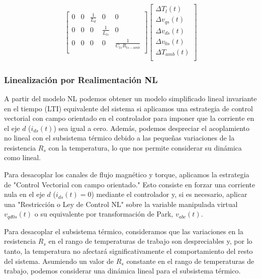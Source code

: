 \documentclass{article}
\begin{document}
\begin{itemize}
\begin{equation*}
\begin{gathered}
\begin{bmatrix}
        0 & 0 & \frac{1}{L_{d}} & 0 & 0\\
        0 & 0 & 0 & \frac{1}{L_{ls}} & 0\\
        0 & 0 & 0 & 0 & \frac{1}{C_{ts}R_{ts-amb}}\\
    \end{bmatrix}
    \begin{bmatrix}
        \Delta{T}_{l}(t)\\
        \Delta{v}_{qs}(t)\\
        \Delta{v}_{ds}(t)\\
        \Delta{v}_{0s}(t)\\
        \Delta T_{amb}(t)\\
    \end{bmatrix} 
\end{gathered}
\end{equation*}

\end{itemize}


\subsubsection{Linealización por Realimentación NL}

A partir del modelo NL podemos obtener un modelo simplificado lineal invariante en el tiempo (LTI) equivalente del sistema
si aplicamos una estrategia de control vectorial con campo orientado en el controlador para imponer
que la corriente en el eje $d$ ($i_{ds}(t)$) sea igual a cero. Además, podemos despreciar 
el acoplamiento no lineal con el subsistema térmico debido a las pequeñas variaciones de la 
resistencia \(R_s\) con la temperatura, lo que nos permite considerar su dinámica como lineal.

Para desacoplar los canales de flujo magnético y torque, aplicamos la estrategia de 
"Control Vectorial con campo orientado." Esto consiste en forzar una corriente nula en el eje 
$d$ ($i_{ds}(t) = 0$) mediante el controlador y, si es necesario, aplicar una "Restricción o Ley 
de Control NL" sobre la variable manipulada virtual \(v_{qd0s}(t)\) o su equivalente por 
transformación de Park, \(v_{{abc}}(t)\).

Para desacoplar el subsistema térmico, consideramos que las variaciones en la resistencia \(R_s\) 
en el rango de temperaturas de trabajo son despreciables y, por lo tanto, la temperatura no 
afectará significativamente el comportamiento del resto del sistema. Asumiendo un valor de $R_s$ constante
en el rango de temperaturas de trabajo, podemos considerar una dinámica lineal para el subsistema térmico.
\end{document}
